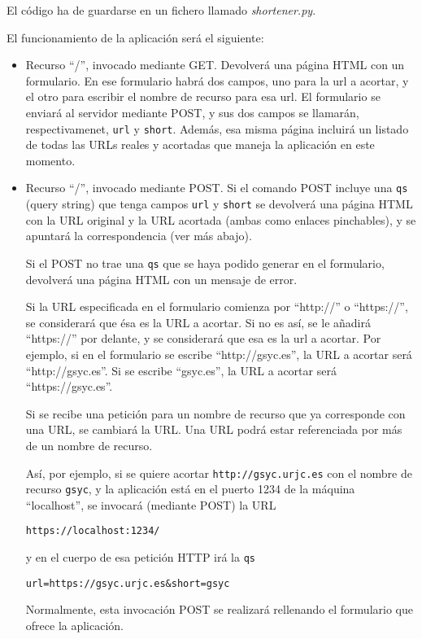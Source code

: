 El código ha de guardarse en un fichero llamado \emph{shortener.py}.

El funcionamiento de la aplicación será el siguiente:

\begin{itemize}
\item Recurso ``/'', invocado mediante GET. Devolverá una página HTML con un formulario. En ese formulario habrá dos campos, uno para la url a acortar, y el otro para escribir el nombre de recurso para esa url. El formulario se enviará al servidor mediante POST, y sus dos campos se llamarán, respectivamenet, \texttt{url} y \texttt{short}. Además, esa misma página incluirá un listado de todas las URLs reales y acortadas que maneja la aplicación en este momento.

\item Recurso ``/'', invocado mediante POST. Si el comando POST incluye una \texttt{qs} (query string) que tenga campos \texttt{url} y \texttt{short} se devolverá una página HTML con la URL original y la URL acortada (ambas como enlaces pinchables), y se apuntará la correspondencia (ver más abajo).

Si el POST no trae una \texttt{qs} que se haya podido generar en el formulario, devolverá una página HTML con un mensaje de error.

Si la URL especificada en el formulario comienza por ``http://'' o ``https://'', se considerará que ésa es la URL a acortar. Si no es así, se le añadirá ``https://'' por delante, y se considerará que esa es la url a acortar. Por ejemplo, si en el formulario se escribe ``http://gsyc.es'', la URL a acortar será ``http://gsyc.es''. Si se escribe ``gsyc.es'', la URL a acortar será ``https://gsyc.es''.

Si se recibe una petición para un nombre de recurso que ya corresponde con una URL, se cambiará la URL. Una URL podrá estar referenciada por más de un nombre de recurso.

Así, por ejemplo, si se quiere acortar \texttt{http://gsyc.urjc.es} con el nombre de recurso \texttt{gsyc}, y la aplicación está en el puerto 1234 de la máquina ``localhost'', se invocará (mediante POST) la URL

\texttt{https://localhost:1234/}

y en el cuerpo de esa petición HTTP irá la \texttt{qs}

\verb|url=https://gsyc.urjc.es&short=gsyc|

Normalmente, esta invocación POST se realizará rellenando el formulario que ofrece la aplicación.


\end{itemize}
